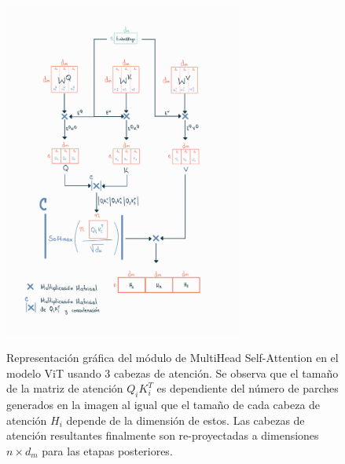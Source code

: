{\begin{figure}[htp]
    \centering
    {\includegraphics[width=0.7\textwidth]{Chapters/4. ViT-Lung/images/cabezas_vit.jpg}}
\caption{Representación gráfica del módulo de MultiHead Self-Attention en el modelo ViT usando 3 cabezas
         de atención. Se observa
         que el tamaño de la matriz de atención $Q_i K_i^T$ es dependiente del número de parches
         generados en la imagen al igual que el tamaño de cada cabeza de atención $H_i$ depende de
         la dimensión de estos. Las cabezas de atención resultantes finalmente son re-proyectadas
         a dimensiones $n \times d_m$ para las etapas posteriores. }
\label{vit-head-dim}
\end{figure}




}
